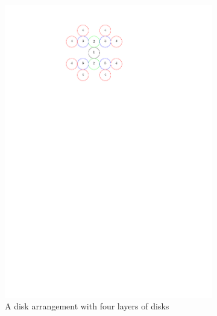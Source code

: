 \begin{figure}[h]
\begin{center}
\begin{subfigure}[b]{0.24\textwidth}
	  \includegraphics[width=\textwidth]{graphics/degree4arrangement.pdf}
	  \caption{A disk arrangement with four layers of disks}
	  \label{fig:circlePacking1-3}
  \end{subfigure}
  \begin{subfigure}[b]{0.24\textwidth}

\end{subfigure}
\end{center}
\end{figure}
